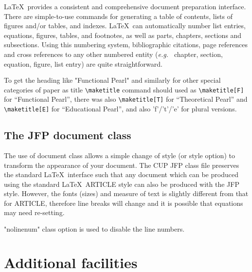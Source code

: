 \documentclass{jfp}
\begin{document}
LaTeX\ provides a consistent and comprehensive document preparation
interface. There are simple-to-use commands for generating a table of
contents, lists of figures and/or tables, and indexes. LaTeX\ can
automatically number list entries, equations, figures, tables, and
footnotes, as well as parts, chapters, sections and subsections.
Using this numbering system, bibliographic citations, page references
and cross references to any other numbered entity ({\it e.g.\ } chapter,
section, equation, figure, list entry) are quite straightforward.

To get the heading like "Functional Pearl" and similarly for other special categories of paper as title \verb"\maketitle" command should used as \verb"\maketitle[F]" for ``Functional Pearl'', there was also \verb"\maketitle[T]" for ``Theoretical Pearl'' and \verb"\maketitle[E]" for ``Educational Pearl'', and also 'f'/'t'/'e' for plural versions.

\subsection{The JFP document class}

The use of document class allows a simple change of style (or style option)
to transform the appearance of your document. The CUP JFP class file preserves
the standard LaTeX\ interface such that any document which can be produced
using the standard LaTeX\ ARTICLE style can also be produced with the
JFP style. However, the fonts (sizes) and measure of text is slightly different
from that for ARTICLE, therefore line breaks will change and it is possible
that equations may need re-setting.

"nolinenum" class option is used to disable the line numbers.

\section{Additional facilities}
\end{document}
